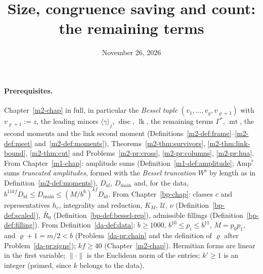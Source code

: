 \documentclass[reqno]{amsart}
\title{Size, congruence saving and count: the remaining terms}
\author{}
\date{November 26, 2026}
\newcounter{chap}
\theoremstyle{definition}
\theoremstyle{plain}
\theoremstyle{remark}
\newcommand{\Uc}{{\mathcal{U}}}
\newcommand{\Rb}{\bar R_0}
\newcommand{\Amp}{\mathrm{Amp}}
\newcommand{\Did}{D_{\mathrm{id}}}
\newcommand{\Dmain}{D_{\mathrm{main}}}
\newcommand{\disc}{\operatorname{disc}}
\newcommand{\lk}{\operatorname{lk}}
\newcommand{\mt}{\operatorname{mt}}
\begin{document}
\maketitle
{}\label{chap}

\paragraph{Prerequisites.}
Chapter~\ref{m2-chap} in full, in particular the \emph{Bessel tuple} \((v_1,\dots,v_\varrho,v_{\varrho+1})\) with \(v_{\varrho+1}:=z\), the leading minors \(\langle\gamma\rangle_j\), \(\disc\), \(\lk\), the remaining terms \(\Gamma^*\), \(\mt\), the second moments and the link second moment (Definitions~\ref{m2-def:frame}--\ref{m2-def:meet} and~\ref{m2-def:moments}), Theorems~\ref{m2-thm:survivors}, \ref{m2-thm:link-bound}, \ref{m2-thm:cut} and Problems~\ref{m2-pr:cross}, \ref{m2-pr:columns}, \ref{m2-pr:hua}.  From Chapter~\ref{m1-chap}: amplitude sums (Definition~\ref{m1-def:amplitude}; \(\Amp^\flat\) sums \emph{truncated amplitudes}, formed with the \emph{Bessel truncation} \(W^\flat\) by length as in Definition~\ref{m2-def:moments}), \(\Did\), \(\Dmain\) and, for the data, \(b^{11kf}\Did\le\Dmain\le(M/b^6)^{kf}\Did\).  From Chapter~\ref{bp-chap}: classes \(c\) and representatives \(h_c\), integrality and reduction, \(K_M\), \(\Uc\), \(\nu\) (Definition~\ref{bp-def:scaled}), \(\Rb\) (Definition~\ref{bp-def:bessel-rep}), admissible fillings (Definition~\ref{bp-def:filling}).  From Definition~\ref{da-def:data}: \(b\ge1000\), \(b^{10}\le p_i\le b^{11}\), \(M=p_0p_1\), and \(\varrho+1=m/2<b\) (Problem~\ref{da-pr:chain} and the definition of \(\varrho\) after Problem~\ref{da-pr:signs}); \(kf\ge40\) (Chapter~\ref{m2-chap}).  Hermitian forms are linear in the first variable; \(\lVert\cdot\rVert\) is the Euclidean norm of the entries; \(k'\ge1\) is an integer (primed, since \(k\) belongs to the data).
\end{document}
